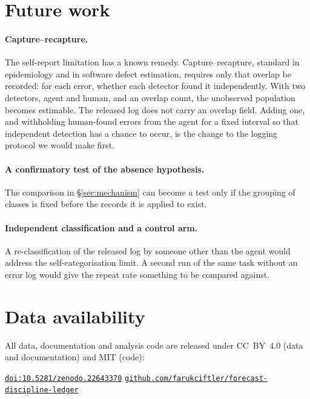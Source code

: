 \documentclass[11pt,a4paper]{article}
\begin{document}
\section{Future work}\label{sec:future}

\paragraph{Capture--recapture.} The self-report limitation has a known remedy.
Capture--recapture, standard in epidemiology and in software defect
estimation, requires only that overlap be recorded: for each error, whether
each detector found it independently. With two detectors, agent and human,
and an overlap count, the unobserved population becomes estimable. The
released log does not carry an overlap field. Adding one, and withholding
human-found errors from the agent for a fixed interval so that independent
detection has a chance to occur, is the change to the logging protocol we
would make first.

\paragraph{A confirmatory test of the absence hypothesis.} The comparison in
\S\ref{sec:mechanism} can become a test only if the grouping of classes is
fixed before the records it is applied to exist.

\paragraph{Independent classification and a control arm.} A re-classification
of the released log by someone other than the agent would address the
self-categorisation limit. A second run of the same task without an error log
would give the repeat rate something to be compared against.

\section{Data availability}

All data, documentation and analysis code are released under CC~BY~4.0 (data
and documentation) and MIT (code):

\begin{center}
\href{https://doi.org/10.5281/zenodo.22643370}{\texttt{doi:10.5281/zenodo.22643370}}
\quad
\href{https://github.com/farukciftler/forecast-discipline-ledger}{\texttt{github.com/farukciftler/forecast-discipline-ledger}}
\end{center}
\end{document}
